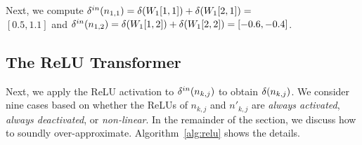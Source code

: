 Next, we compute
$\delta^{in}(n_{1,1}) = \delta(W_1[1,1]) + \delta(W_1[2,1]) =$ \\$ [0.5, 1.1] $ and
$\delta^{in}(n_{1,2}) = \delta(W_1[1,2]) + \delta(W_1[2,2]) = [-0.6, -0.4] $.


\subsection{The ReLU Transformer}

Next, we apply the ReLU activation to $\delta^{in}(n_{k,j})$ to obtain
$\delta(n_{k,j})$.
%
We consider  nine cases
based on whether the ReLUs of $n_{k,j}$ and $n'_{k,j}$
are \emph{always activated}, \emph{always deactivated},
or \emph{non-linear}.
%
In the remainder of the section, we discuss how to soundly
over-approximate. Algorithm~\ref{alg:relu} shows the details.

